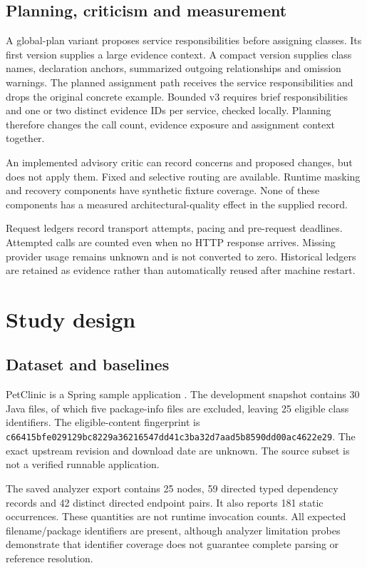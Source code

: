 \subsection{Planning, criticism and measurement}

A global-plan variant proposes service responsibilities before assigning classes. Its first version supplies a large evidence context. A compact version supplies class names, declaration anchors, summarized outgoing relationships and omission warnings. The planned assignment path receives the service responsibilities and drops the original concrete example. Bounded v3 requires brief responsibilities and one or two distinct evidence IDs per service, checked locally. Planning therefore changes the call count, evidence exposure and assignment context together.

An implemented advisory critic can record concerns and proposed changes, but does not apply them. Fixed and selective routing are available. Runtime masking and recovery components have synthetic fixture coverage. None of these components has a measured architectural-quality effect in the supplied record.

Request ledgers record transport attempts, pacing and pre-request deadlines. Attempted calls are counted even when no HTTP response arrives. Missing provider usage remains unknown and is not converted to zero. Historical ledgers are retained as evidence rather than automatically reused after machine restart.

\section{Study design}

\subsection{Dataset and baselines}

PetClinic is a Spring sample application \cite{petclinic}. The development snapshot contains 30 Java files, of which five package-info files are excluded, leaving 25 eligible class identifiers. The eligible-content fingerprint is \texttt{c66415bfe029129b\allowbreak{}c8229a36216547dd\allowbreak{}41c3ba32d7aad5b8\allowbreak{}590dd00ac4622e29}. The exact upstream revision and download date are unknown. The source subset is not a verified runnable application.

The saved analyzer export contains 25 nodes, 59 directed typed dependency records and 42 distinct directed endpoint pairs. It also reports 181 static occurrences. These quantities are not runtime invocation counts. All expected filename/package identifiers are present, although analyzer limitation probes demonstrate that identifier coverage does not guarantee complete parsing or reference resolution.

